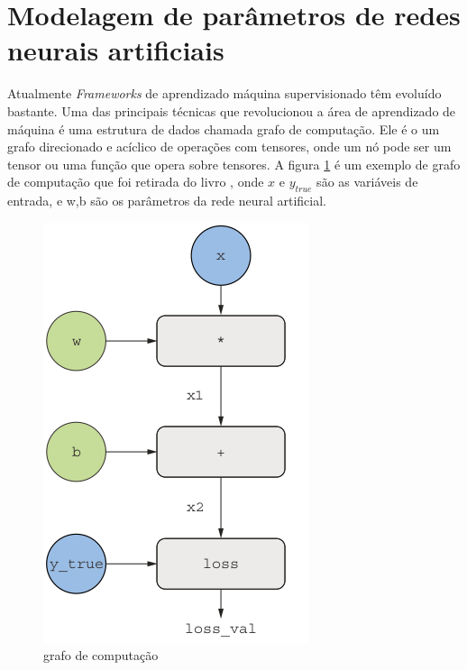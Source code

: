 \section{Modelagem de parâmetros de redes neurais artificiais}
Atualmente \textit{Frameworks} de aprendizado máquina supervisionado
têm evoluído bastante. Uma das principais técnicas que revolucionou a
área de aprendizado de máquina é uma estrutura de dados chamada grafo
de computação. Ele é o um grafo direcionado e acíclico de operações com
tensores, onde um nó pode ser um tensor ou uma função que opera sobre
tensores. A figura \ref{fig:grafo:computacional} é um exemplo de
grafo de computação que foi retirada do livro \cite{chollet2021deep},
onde $x$ e $y_{true}$ são as variáveis de entrada, e w,b são
os parâmetros da rede neural artificial. 

\begin{figure}[H]
    \label{fig:grafo:computacional}
    \centering
    \includegraphics[scale=0.5]{figuras/grafo_computacional.png}
    \caption{grafo de computação}
\end{figure}

